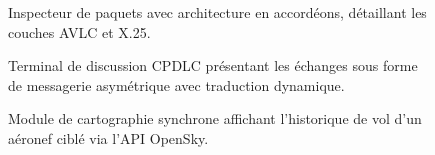 \documentclass[a4paper,11pt]{report}
\begin{document}
\begin{figure}[htbp]
    \centering
    \caption{Inspecteur de paquets avec architecture en accordéons, détaillant les couches AVLC et X.25.}
    \label{fig:wireshark_view}
\end{figure}

\begin{figure}[htbp]
    \centering
    \caption{Terminal de discussion CPDLC présentant les échanges sous forme de messagerie asymétrique avec traduction dynamique.}
    \label{fig:chat_cpdlc}
\end{figure}

\begin{figure}[htbp]
    \centering
    \caption{Module de cartographie synchrone affichant l'historique de vol d'un aéronef ciblé via l'API OpenSky.}
    \label{fig:map_module}
\end{figure}
\end{document}
